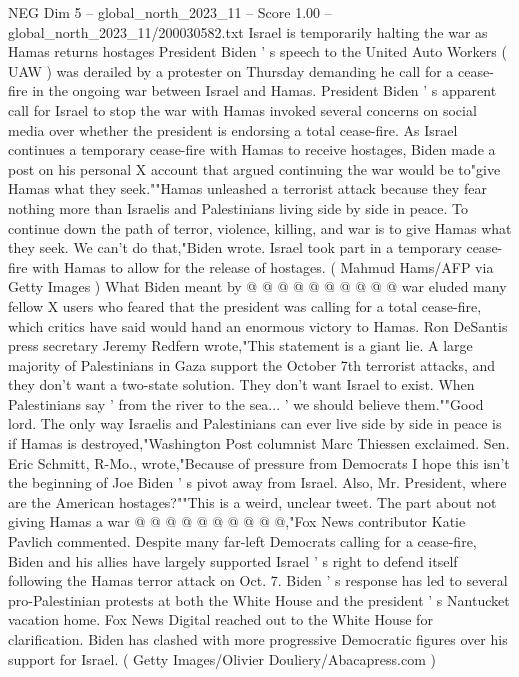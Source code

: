 \begin{textsample}{NEG Dim 5 – global\_north\_2023\_11 – Score 1.00 – global\_north\_2023\_11/200030582.txt}  \label{ex:f5_neg_034}
Israel is temporarily halting the war as Hamas returns hostages President Biden ' s speech to the United Auto Workers ( UAW ) was derailed by a protester on Thursday demanding he call for a cease-fire in the ongoing war between Israel and Hamas.
President Biden ' s apparent call for Israel to stop the war with Hamas invoked several concerns on social media over whether the president is endorsing a total cease-fire.
As Israel continues a temporary cease-fire with Hamas to receive hostages, Biden made a post on his personal X account that argued continuing the war would be to"give Hamas what they seek.""Hamas unleashed a terrorist attack because they fear nothing more than Israelis and Palestinians living side by side in peace.
To continue down the path of terror, violence, killing, and war is to give Hamas what they seek.
We can't do that,"Biden wrote.
Israel took part in a temporary cease-fire with Hamas to allow for the release of hostages. ( Mahmud Hams/AFP via Getty Images ) What Biden meant by @ @ @ @ @ @ @ @ @ @ war eluded many fellow X users who feared that the president was calling for a total cease-fire, which critics have said would hand an enormous victory to Hamas.
Ron DeSantis press secretary Jeremy Redfern wrote,"This statement is a giant lie.
A large majority of Palestinians in Gaza support the October 7th terrorist attacks, and they don't want a two-state solution.
They don't want Israel to exist.
When Palestinians say ' from the river to the sea... ' we should believe them.""Good lord.
The only way Israelis and Palestinians can ever live side by side in peace is if Hamas is destroyed,"Washington Post columnist Marc Thiessen exclaimed.
Sen.
Eric Schmitt, R-Mo., wrote,"Because of pressure from Democrats I hope this isn't the beginning of Joe Biden ' s pivot away from Israel.
Also, Mr.
President, where are the American hostages?""This is a weird, unclear tweet.
The part about not giving Hamas a war @ @ @ @ @ @ @ @ @ @,"Fox News contributor Katie Pavlich commented.
Despite many far-left Democrats calling for a cease-fire, Biden and his allies have largely supported Israel ' s right to defend itself following the Hamas terror attack on Oct. 7.
Biden ' s response has led to several pro-Palestinian protests at both the White House and the president ' s Nantucket vacation home.
Fox News Digital reached out to the White House for clarification.
Biden has clashed with more progressive Democratic figures over his support for Israel. ( Getty Images/Olivier Douliery/Abacapress.com )

\end{textsample}
